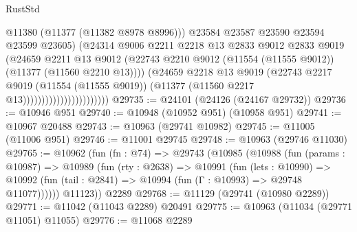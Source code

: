 \begin{lexlean}{RustStd}
\begin{coremodule}
                                            @11380
                                            (@11377 (@11382 @8978 @8996)))
                                          @23584
                                          @23587
                                          @23590
                                          @23594
                                          @23599
                                          @23605)
                                        (@24314
                                          @9006
                                          @2211
                                          @2218
                                          @13
                                          @2833
                                          @9012
                                          @2833
                                          @9019
                                          (@24659
                                            @2211
                                            @13
                                            @9012
                                            (@22743
                                              @2210
                                              @9012
                                              (@11554 (@11555 @9012))
                                              (@11377 (@11560 @2210 @13))))
                                          (@24659
                                            @2218
                                            @13
                                            @9019
                                            (@22743
                                              @2217
                                              @9019
                                              (@11554 (@11555 @9019))
                                              (@11377 (@11560 @2217 @13)))))))))))))))))))))))
@29735 := @24101 (@24126 (@24167 @29732))
@29736 := @10946 @951
@29740 := @10948 (@10952 @951) (@10958 @951)
@29741 := @10967 @20488
@29743 := @10963 (@29741 @10982)
@29745 := @11005 (@11006 @951)
@29746 := @11001 @29745
@29748 := @10963 (@29746 @11030)
@29765 := @10962
    (fun (fn : @74) =>
    @29743
      (@10985
        (@10988
          (fun (params : @10987) =>
          @10989
            (fun (rty : @2638) =>
            @10991
              (fun (lets : @10990) =>
              @10992 (fun (tail : @2841) => @10994 (fun (Γ : @10993) => @29748 @11077))))))
        @11123))
    @2289
@29768 := @11129 (@29741 (@10980 @2289))
@29771 := @11042 (@11043 @2289) @20491
@29775 := @10963 (@11034 (@29771 @11051) @11055)
@29776 := @11068 @2289

\end{coremodule}
\end{lexlean}
